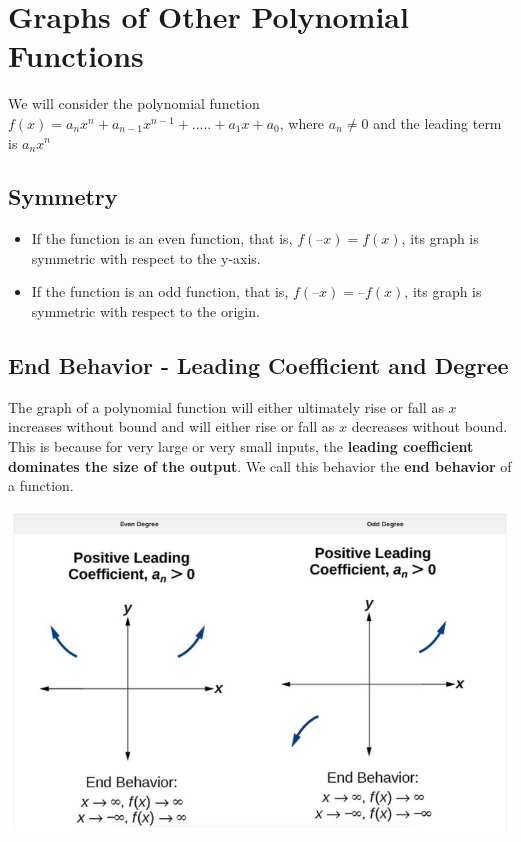 \documentclass{book}
\begin{document}
	\section{Graphs of Other Polynomial Functions}
	
	We will consider the polynomial function $f(x) = a_nx^n + a_{n-1}x^{n-1} + .....+ a_1x + a_0$, where $a_n \neq 0$ and the leading term is $a_nx^n$
	
	\subsection{Symmetry}
	
	\begin{itemize}
		\item If the function is an even function, that is, $f(–x) = f(x)$, its graph is symmetric with respect to the y-axis.
		\item If the function is an odd function, that is, $f(–x) = –f(x)$, its graph is symmetric with respect to the origin.
	\end{itemize}
	
	\subsection{End Behavior - Leading Coefficient and Degree}
	
	The graph of a polynomial function will either ultimately rise or fall as $x$ increases without bound and will either rise or fall as $x$ decreases without bound. This is because for very large or very small inputs, the \textbf{ leading coefficient dominates the size of the output}. We call this behavior the \textbf{end behavior} of a function.
	
	\includegraphics[scale=0.5]{evenodd1}
	
\end{document}

